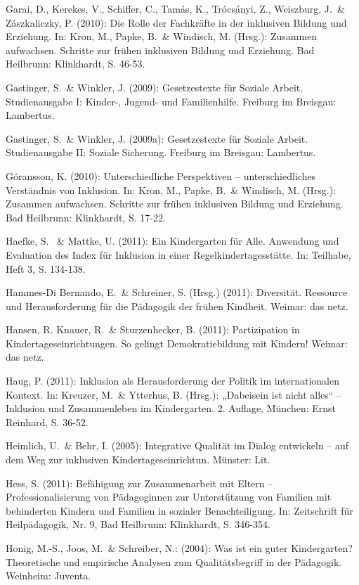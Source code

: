 Garai, D., Kerekes, V., Schiffer, C., Tamás,
K., Trócsányi, Z., Weiszburg, J.~\& Zászkaliczky, P. (2010):
Die Rolle der Fachkräfte in der inklusiven Bildung und
Erziehung. In: Kron, M., Papke, B.~\& Windisch, M. (Hrsg.): Zusammen aufwachsen. Schritte zur frühen inklusiven Bildung und Erziehung. Bad Heilbrunn: Klinkhardt, S. 46-53.

Gastinger, S.~\& Winkler, J. (2009): Gesetzestexte für Soziale Arbeit. Studienausgabe I: Kinder-, Jugend- und Familienhilfe. Freiburg im Breisgau: Lambertus.

Gastinger, S.~\& Winkler, J. (2009a): Gesetzestexte für Soziale Arbeit. Studienausgabe II: Soziale Sicherung. Freiburg im Breisgau: Lambertus.

Göransson, K. (2010): Unterschiedliche Perspektiven – unterschiedliches Verständnis von Inklusion. In: Kron, M., Papke, B.~\& Windisch, M. (Hrsg.): Zusammen aufwachsen. Schritte zur frühen inklusiven Bildung und Erziehung. Bad Heilbrunn: Klinkhardt, S. 17-22. 

Haefke, S. ~\& Mattke, U. (2011): Ein Kindergarten für Alle. Anwendung und Evaluation des Index für Inklusion in einer Regelkindertagesstätte. In: Teilhabe, Heft 3, S. 134-138.

Hammes-Di Bernando, E.~\& Schreiner, S. (Hrsg.) (2011): Diversität. Ressource und Herausforderung für die Pädagogik der frühen Kindheit. Weimar: das netz. 

Hansen, R. Knauer, R.~\& Sturzenhecker, B. (2011): Partizipation in Kindertageseinrichtungen. So gelingt Demokratiebildung mit Kindern! Weimar: das netz.

Haug, P. (2011): Inklusion als Herausforderung der Politik im internationalen Kontext. In: Kreuzer, M.~\& Ytterhus, B. (Hrsg.): „Dabeisein ist nicht alles“ -- Inklusion und Zusammenleben im Kindergarten. 2. Auflage, München: Ernst Reinhard, S. 36-52.   

Heimlich, U.~\& Behr, I. (2005): Integrative Qualität im Dialog entwickeln – auf dem Weg zur inklusiven Kindertageseinrichtun. Münster: Lit. 


Hess, S. (2011): Befähigung zur Zusammenarbeit mit Eltern -- Professionalisierung von Pädagoginnen zur Unterstützung von Familien mit behinderten Kindern und Familien in sozialer Benachteiligung. In: Zeitschrift für Heilpädagogik, Nr. 9, Bad Heilbrunn: Klinkhardt, S. 346-354.  

Honig, M.-S., Joos, M.~\& Schreiber, N.: (2004): Was ist ein guter Kindergarten? Theoretische und empirische Analysen zum Qualitätsbegriff in der Pädagogik. Weinheim: Juventa.

